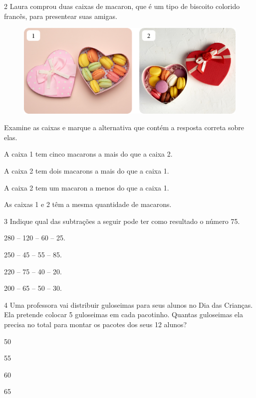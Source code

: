 \num{2} Laura comprou duas caixas de macaron, que é um tipo de biscoito colorido
francês, para presentear suas amigas. 

\begin{figure}[H]
\centering
\includegraphics[width=.8\textwidth]{./media/image152.png}
\end{figure}

Examine as caixas e marque a
alternativa que contém a resposta correta sobre elas.

\begin{escolha}[itemsep=-5pt]
\item A caixa 1 tem cinco macarons a mais do que a caixa 2.

\item A caixa 2 tem dois macarons a mais do que a caixa 1.

\item A caixa 2 tem um macaron a menos do que a caixa 1.

\item As caixas 1 e 2 têm a mesma quantidade de macarons.
\end{escolha}

\num{3} Indique qual das subtrações a seguir pode ter como resultado o número 75.

\begin{escolha}[itemsep=-5pt]
\item 280 -- 120 -- 60 -- 25.

\item 250 -- 45 -- 55 -- 85.

\item 220 -- 75 -- 40 -- 20.

\item 200 -- 65 -- 50 -- 30.
\end{escolha}

\num{4} Uma professora vai distribuir guloseimas para seus alunos no Dia das
Crianças. Ela pretende colocar 5 guloseimas em cada pacotinho. Quantas
guloseimas ela precisa no total para montar os pacotes dos seus 12
alunos?

\begin{escolha}[itemsep=-5pt]
\item 50

\item 55

\item 60

\item 65
\end{escolha}

